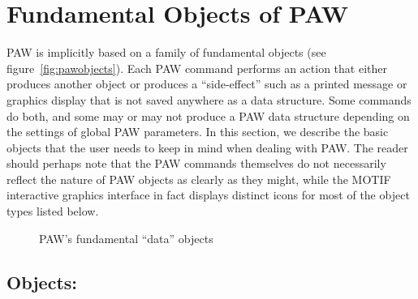 \section{Fundamental Objects of PAW}
 
PAW is implicitly based on a family of fundamental objects 
(see figure~\vref{fig:pawobjects}). Each PAW command performs an action that 
either produces another object or produces a ``side-effect'' such as a printed
message or graphics display that is not saved anywhere as a data structure.  
Some commands do both, and some may or may not produce a PAW data structure 
depending on the settings of global PAW parameters. In this section, we 
describe the basic objects that the user needs to keep in mind when dealing 
with PAW. The reader should perhaps note that the PAW commands themselves do 
not necessarily reflect the nature of PAW objects as clearly as they might, 
while the MOTIF interactive graphics interface in fact displays distinct icons
for most of the object types listed below.

\begin{figure}
\begin{center}
\mbox{}
\end{center}
\caption{PAW's fundamental ``data'' objects}
\label{fig:pawobjects}
\end{figure}

\subsection*{Objects:}

